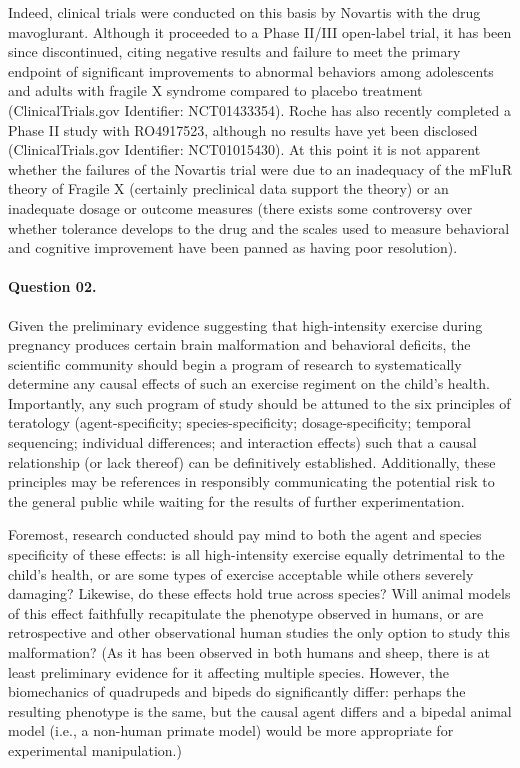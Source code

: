 \documentclass[11pt,letterpaper,final] {article}
\begin{document}
Indeed, clinical trials were conducted on this basis by Novartis with the drug mavoglurant. Although it proceeded to a Phase II/III open-label trial, it has been since discontinued, citing negative results and failure to meet the primary endpoint of significant improvements to abnormal behaviors among adolescents and adults with fragile X syndrome compared to placebo treatment (ClinicalTrials.gov Identifier: NCT01433354). Roche has also recently completed a Phase II study with RO4917523, although no results have yet been disclosed (ClinicalTrials.gov Identifier: NCT01015430). At this point it is not apparent whether the failures of the Novartis trial were due to an inadequacy of the mFluR theory of Fragile X (certainly preclinical data support the theory) or an inadequate dosage or outcome measures (there exists some controversy over whether tolerance develops to the drug and the scales used to measure behavioral and cognitive improvement have been panned as having poor resolution).

\paragraph{Question 02.} Given the preliminary evidence suggesting that high-intensity exercise during pregnancy produces certain brain malformation and behavioral deficits, the scientific community should begin a program of research to systematically determine any causal effects of such an exercise regiment on the child's health. Importantly, any such program of study should be attuned to the six principles of teratology (agent-specificity; species-specificity; dosage-specificity; temporal sequencing; individual differences; and interaction effects) such that a causal relationship (or lack thereof) can be definitively established. Additionally, these principles may be references in responsibly communicating the potential risk to the general public while waiting for the results of further experimentation.

Foremost, research conducted should pay mind to both the agent and species specificity of these effects: is all high-intensity exercise equally detrimental to the child's health, or are some types of exercise acceptable while others severely damaging? Likewise, do these effects hold true across species? Will animal models of this effect faithfully recapitulate the phenotype observed in humans, or are retrospective and other observational human studies the only option to study this malformation? (As it has been observed in both humans and sheep, there is at least preliminary evidence for it affecting multiple species. However, the biomechanics of quadrupeds and bipeds do significantly differ: perhaps the resulting phenotype is the same, but the causal agent differs and a bipedal animal model (i.e., a non-human primate model) would be more appropriate for experimental manipulation.)
\end{document}
